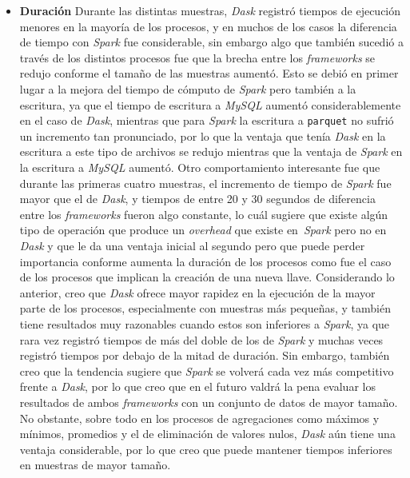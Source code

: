 \begin{itemize}
	\item \textbf{Duración} Durante las distintas muestras, \textit{Dask} registró tiempos de ejecución menores en la mayoría de los procesos, y en muchos de los casos la diferencia de tiempo con \textit{Spark} fue considerable, sin embargo algo que también sucedió a través de los distintos procesos fue que la brecha entre los \textit{frameworks} se redujo conforme el tamaño de las muestras aumentó. Esto se debió en primer lugar a la mejora del tiempo de cómputo de \textit{Spark} pero también a la escritura, ya que el tiempo de escritura a \textit{MySQL} aumentó considerablemente en el caso de \textit{Dask}, mientras que para \textit{Spark} la escritura a \texttt{parquet} no sufrió un incremento tan pronunciado, por lo que la ventaja que tenía \textit{Dask} en la escritura a este tipo de archivos se redujo mientras que la ventaja de \textit{Spark} en la escritura a \textit{MySQL} aumentó. Otro comportamiento interesante fue que durante las primeras cuatro muestras, el incremento de tiempo de \textit{Spark} fue mayor que el de \textit{Dask}, y tiempos de entre 20 y 30 segundos de diferencia entre los \textit{frameworks} fueron algo constante, lo cuál sugiere que existe algún tipo de operación que produce un \textit{overhead} que existe en\ \textit{Spark} pero no en \textit{Dask} y que le da una ventaja inicial al segundo pero que puede perder importancia conforme aumenta la duración de los procesos como fue el caso de los procesos que implican la creación de una nueva llave. Considerando lo anterior, creo que \textit{Dask} ofrece mayor rapidez en la ejecución de la mayor parte de los procesos, especialmente con muestras más pequeñas, y también tiene resultados muy razonables cuando estos son inferiores a \textit{Spark}, ya que rara vez registró tiempos de más del doble de los de \textit{Spark} y muchas veces registró tiempos por debajo de la mitad de duración. Sin embargo, también creo que la tendencia sugiere que \textit{Spark} se volverá cada vez más competitivo frente a \textit{Dask}, por lo que creo que en el futuro valdrá la pena evaluar los resultados de ambos \textit{frameworks} con un conjunto de datos de mayor tamaño. No obstante, sobre todo en los procesos de agregaciones como máximos y mínimos, promedios y el de eliminación de valores nulos, \textit{Dask} aún tiene una ventaja considerable, por lo que creo que puede mantener tiempos inferiores en muestras de mayor tamaño.
	
\end{itemize}